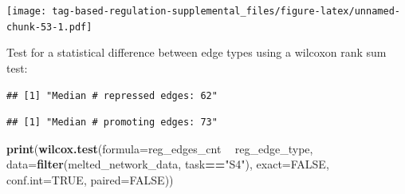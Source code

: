 \documentclass[]{book}
\newenvironment{Shaded}{\begin{snugshade}}{\end{snugshade}}
\newcommand{\DataTypeTok}[1]{\textcolor[rgb]{0.13,0.29,0.53}{#1}}
\newcommand{\KeywordTok}[1]{\textcolor[rgb]{0.13,0.29,0.53}{\textbf{#1}}}
\newcommand{\NormalTok}[1]{#1}
\newcommand{\OperatorTok}[1]{\textcolor[rgb]{0.81,0.36,0.00}{\textbf{#1}}}
\newcommand{\OtherTok}[1]{\textcolor[rgb]{0.56,0.35,0.01}{#1}}
\newcommand{\StringTok}[1]{\textcolor[rgb]{0.31,0.60,0.02}{#1}}
\begin{document}
\texttt{[image: tag-based-regulation-supplemental\_files/figure-latex/unnamed-chunk-53-1.pdf]}

Test for a statistical difference between edge types using a wilcoxon rank sum test:

\begin{Shaded}
\end{Shaded}

\begin{verbatim}
## [1] "Median # repressed edges: 62"
\end{verbatim}

\begin{Shaded}
\end{Shaded}

\begin{verbatim}
## [1] "Median # promoting edges: 73"
\end{verbatim}

\begin{Shaded}
\begin{Highlighting}[]
\KeywordTok{print}\NormalTok{(}\KeywordTok{wilcox.test}\NormalTok{(}\DataTypeTok{formula=}\NormalTok{reg_edges_cnt }\OperatorTok{~}\StringTok{ }\NormalTok{reg_edge_type, }\DataTypeTok{data=}\KeywordTok{filter}\NormalTok{(melted_network_data, task}\OperatorTok{==}\StringTok{"S4"}\NormalTok{), }\DataTypeTok{exact=}\OtherTok{FALSE}\NormalTok{, }\DataTypeTok{conf.int=}\OtherTok{TRUE}\NormalTok{, }\DataTypeTok{paired=}\OtherTok{FALSE}\NormalTok{))}
\end{Highlighting}
\end{Shaded}
\end{document}

